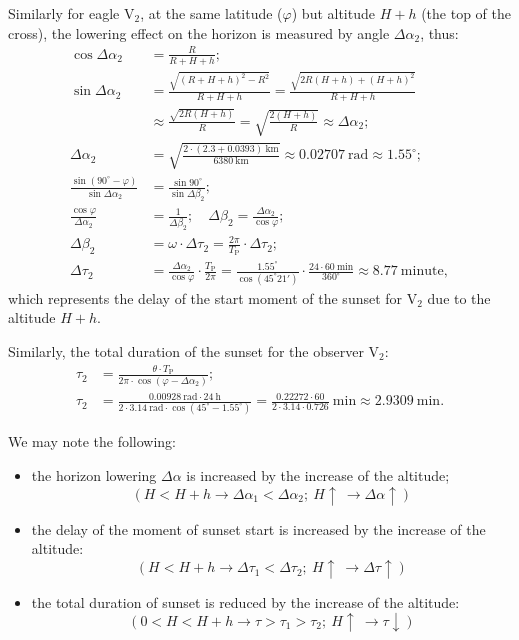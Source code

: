 \begin{description}
  Similarly for eagle $\mathrm{V}_2$, at the same latitude ($\varphi$) but
  altitude $H + h$ (the top of the cross), the lowering effect on the
  horizon is measured by angle $\Delta\alpha_2$, thus:
  \begin{align*}
  \cos\Delta\alpha_2 &= \frac{R}{R+H+h};\\
  \sin\Delta\alpha_2
    &= \frac{\sqrt{(R+H+h)^2 - R^2}}{R+H+h}
       = \frac{\sqrt{2R(H+h) + (H+h)^2}}{R+H+h}\\
    &\approx \frac{\sqrt{2R(H+h)}}{R}
       = \sqrt{\frac{2(H+h)}{R}} \approx \Delta\alpha_2;\\
  \Delta\alpha_2 &= \sqrt{\frac{2\cdot(2.3 + 0.0393)\ \mathrm{km}}
                              {6380\ \mathrm{km}}}
    \approx 0.02707\ \mathrm{rad} \approx 1.55^\circ;\\
  \frac{\sin(90^\circ - \varphi)}{\sin\Delta\alpha_2}
    &= \frac{\sin 90^\circ}{\sin\Delta\beta_2};\\
  \frac{\cos\varphi}{\Delta\alpha_2} &= \frac{1}{\Delta\beta_2};\quad
    \Delta\beta_2 = \frac{\Delta\alpha_2}{\cos\varphi};\\
  \Delta\beta_2 &= \omega\cdot\Delta\tau_2
    = \frac{2\pi}{T_{\mathrm{P}}}\cdot\Delta\tau_2;\\
  \Delta\tau_2 &= \frac{\Delta\alpha_2}{\cos\varphi}\cdot
      \frac{T_{\mathrm{P}}}{2\pi}
    = \frac{1.55^\circ}{\cos(45^\circ 21')}\cdot
      \frac{24\cdot 60\ \mathrm{min}}{360^\circ}
    \approx 8.77\ \mathrm{minute},
  \end{align*}
  which represents the delay of the start moment of the sunset for
  $\mathrm{V}_2$ due to the altitude $H + h$.

  Similarly, the total duration of the sunset for the observer
  $\mathrm{V}_2$:
  \begin{align*}
  \tau_2 &= \frac{\theta\cdot T_{\mathrm{P}}}
                {2\pi\cdot\cos(\varphi - \Delta\alpha_2)};\\
  \tau_2 &= \frac{0.00928\ \mathrm{rad}\cdot 24\ \mathrm{h}}
               {2\cdot 3.14\ \mathrm{rad}\cdot\cos(45^\circ - 1.55^\circ)}
    = \frac{0.22272\cdot 60}{2\cdot 3.14\cdot 0.726}\ \mathrm{min}
    \approx 2.9309\ \mathrm{min}.
  \end{align*}

  We may note the following:
  \begin{itemize}
  \item the horizon lowering $\Delta\alpha$ is increased by the increase of
    the altitude;
    \[ (H < H+h \rightarrow \Delta\alpha_1 < \Delta\alpha_2;\
       H\uparrow\ \rightarrow \Delta\alpha\uparrow) \]
  \item the delay of the moment of sunset start is increased by the increase
    of the altitude:
    \[ (H < H+h \rightarrow \Delta\tau_1 < \Delta\tau_2;\
       H\uparrow\ \rightarrow \Delta\tau\uparrow) \]
  \item the total duration of sunset is reduced by the increase of the
    altitude:
    \[ (0 < H < H+h \rightarrow \tau > \tau_1 > \tau_2;\
       H\uparrow\ \rightarrow \tau\downarrow) \]
  \end{itemize}


\end{description}
